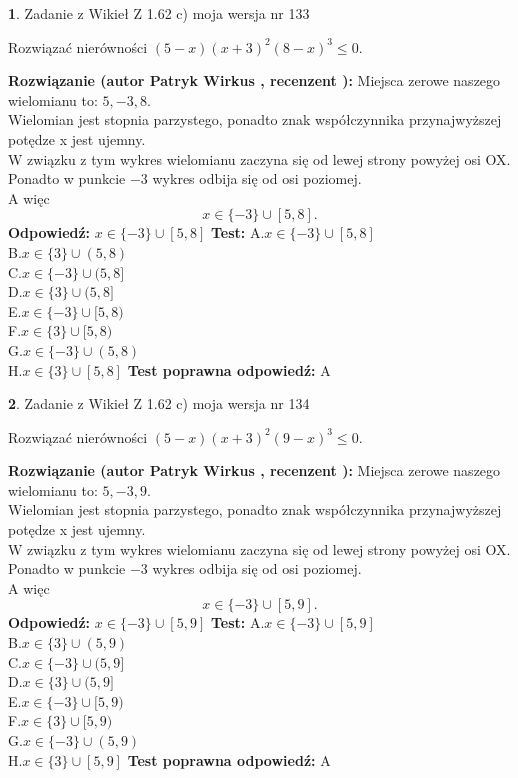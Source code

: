 \documentclass[12pt, a4paper]{article}
\theoremstyle{definition} %
\newtheorem{zad}{}
\newcommand{\zadStart}[1]{\begin{zad}#1\newline}
\newcommand{\zadStop}{\end{zad}}
\newcommand{\rozwStart}[2]{\noindent \textbf{Rozwiązanie (autor #1 , recenzent #2): }\newline}
\newcommand{\rozwStop}{\newline}
\newcommand{\odpStart}{\noindent \textbf{Odpowiedź:}\newline}
\newcommand{\odpStop}{\newline}
\newcommand{\testStart}{\noindent \textbf{Test:}\newline}
\newcommand{\testStop}{\newline}
\newcommand{\kluczStart}{\noindent \textbf{Test poprawna odpowiedź:}\newline}
\newcommand{\kluczStop}{\newline}
\begin{document}
\zadStart{Zadanie z Wikieł Z 1.62 c) moja wersja nr 133}

Rozwiązać nierówności $(5-x)(x+3)^{2}(8-x)^{3}\le0$.
\zadStop
\rozwStart{Patryk Wirkus}{}
Miejsca zerowe naszego wielomianu to: $5, -3, 8$.\\
Wielomian jest stopnia parzystego, ponadto znak współczynnika przy\linebreak najwyższej potędze x jest ujemny.\\ W związku z tym wykres wielomianu zaczyna się od lewej strony powyżej osi OX.\\
Ponadto w punkcie $-3$ wykres odbija się od osi poziomej.\\
A więc $$x \in \{-3\} \cup [5,8].$$
\rozwStop
\odpStart
$x \in \{-3\} \cup [5,8]$
\odpStop
\testStart
A.$x \in \{-3\} \cup [5,8]$\\
B.$x \in \{3\} \cup (5,8)$\\
C.$x \in \{-3\} \cup (5,8]$\\
D.$x \in \{3\} \cup (5,8]$\\
E.$x \in \{-3\} \cup [5,8)$\\
F.$x \in \{3\} \cup [5,8)$\\
G.$x \in \{-3\} \cup (5,8)$\\
H.$x \in \{3\} \cup [5,8]$
\testStop
\kluczStart
A
\kluczStop



\zadStart{Zadanie z Wikieł Z 1.62 c) moja wersja nr 134}

Rozwiązać nierówności $(5-x)(x+3)^{2}(9-x)^{3}\le0$.
\zadStop
\rozwStart{Patryk Wirkus}{}
Miejsca zerowe naszego wielomianu to: $5, -3, 9$.\\
Wielomian jest stopnia parzystego, ponadto znak współczynnika przy\linebreak najwyższej potędze x jest ujemny.\\ W związku z tym wykres wielomianu zaczyna się od lewej strony powyżej osi OX.\\
Ponadto w punkcie $-3$ wykres odbija się od osi poziomej.\\
A więc $$x \in \{-3\} \cup [5,9].$$
\rozwStop
\odpStart
$x \in \{-3\} \cup [5,9]$
\odpStop
\testStart
A.$x \in \{-3\} \cup [5,9]$\\
B.$x \in \{3\} \cup (5,9)$\\
C.$x \in \{-3\} \cup (5,9]$\\
D.$x \in \{3\} \cup (5,9]$\\
E.$x \in \{-3\} \cup [5,9)$\\
F.$x \in \{3\} \cup [5,9)$\\
G.$x \in \{-3\} \cup (5,9)$\\
H.$x \in \{3\} \cup [5,9]$
\testStop
\kluczStart
A
\kluczStop
\end{document}
